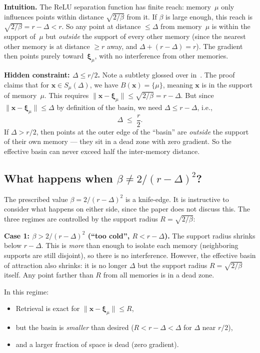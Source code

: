 \documentclass[11pt]{article}
\begin{document}
\textbf{Intuition.}
The ReLU separation function has finite reach: memory~$\mu$ only influences
points within distance $\sqrt{2/\beta}$ from it.  If $\beta$ is large enough,
this reach is $\sqrt{2/\beta} = r - \Delta < r$.  So any point at distance
$\leq \Delta$ from memory~$\mu$ is within the support of~$\mu$ but
\emph{outside} the support of every other memory (since the nearest other
memory is at distance $\geq r$ away, and $\Delta + (r-\Delta) = r$).
The gradient then points purely toward~$\boldsymbol{\xi}_\mu$, with no
interference from other memories.

\textbf{Hidden constraint: $\Delta \leq r/2$.}
Note a subtlety glossed over in~\cite{Hoover2025}.  The proof claims that for
$\mathbf{x}\in S_\mu(\Delta)$, we have $B(\mathbf{x}) = \{\mu\}$, meaning
$\mathbf{x}$ is in the support of memory~$\mu$.  This requires
$\|\mathbf{x}-\boldsymbol{\xi}_\mu\| \leq \sqrt{2/\beta} = r - \Delta$.
But since $\|\mathbf{x}-\boldsymbol{\xi}_\mu\|\leq\Delta$ by definition of the
basin, we need $\Delta \leq r - \Delta$, i.e.,
\begin{equation}
  \Delta \;\leq\; \frac{r}{2}.
\end{equation}
If $\Delta > r/2$, then points at the outer edge of the ``basin'' are
\emph{outside} the support of their own memory --- they sit in a dead zone
with zero gradient.  So the effective basin can never exceed half the
inter-memory distance.

\subsection{What happens when $\beta \neq 2/(r-\Delta)^2$?}

The prescribed value $\beta = 2/(r-\Delta)^2$ is a knife-edge.  It is
instructive to consider what happens on either side, since the paper does not
discuss this.  The three regimes are controlled by the support radius
$R = \sqrt{2/\beta}$:

\medskip
\textbf{Case 1: $\beta > 2/(r-\Delta)^2$ \;(``too cold'', $R < r-\Delta$).}
The support radius shrinks below $r - \Delta$.  This is \emph{more} than
enough to isolate each memory (neighboring supports are still disjoint), so
there is no interference.  However, the effective basin of attraction also
shrinks: it is no longer $\Delta$ but the support radius $R = \sqrt{2/\beta}$
itself.  Any point farther than $R$ from all memories is in a dead zone.

In this regime:
\begin{itemize}
  \item Retrieval is exact for $\|\mathbf{x}-\boldsymbol{\xi}_\mu\| \leq R$,
  \item but the basin is \emph{smaller} than desired ($R < r - \Delta < \Delta$
        for $\Delta$ near $r/2$),
  \item and a larger fraction of space is dead (zero gradient).
\end{itemize}
\end{document}
